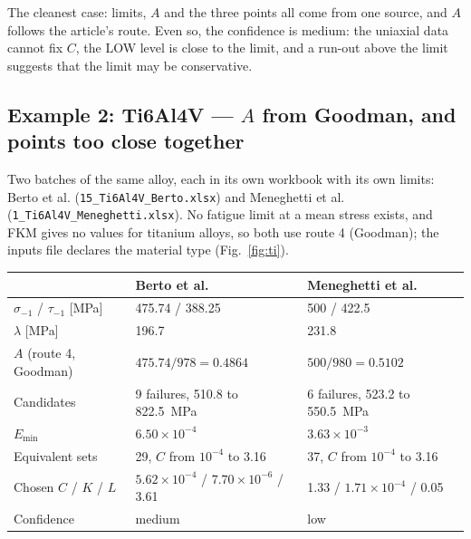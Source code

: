 \documentclass[11pt,a4paper]{article}
\newcommand{\sigm}{\sigma_{-1}}
\newcommand{\taum}{\tau_{-1}}
\newcommand{\Emin}{E_{\min}}
\begin{document}
\begin{lesson}
The cleanest case: limits, $A$ and the three points all come from one source, and $A$ follows the article's route.
Even so, the confidence is medium: the uniaxial data cannot fix $C$, the LOW level is close to the limit, and a
run-out above the limit suggests that the limit may be conservative.
\end{lesson}

\FloatBarrier
\subsection*{Example 2: Ti6Al4V --- $A$ from Goodman, and points too close together}
Two batches of the same alloy, each in its own workbook with its own limits: Berto et al.
(\texttt{15\_Ti6Al4V\_Berto.xlsx}) and Meneghetti et al. (\texttt{1\_Ti6Al4V\_Meneghetti.xlsx}). No fatigue limit
at a mean stress exists, and FKM gives no values for titanium alloys, so both use route 4 (Goodman); the inputs file
declares the material type (Fig.~\ref{fig:ti}).

\begin{center}
\begin{tabular}{@{}l l l@{}}
\toprule
 & Berto et al. & Meneghetti et al. \\
\midrule
$\sigm$ / $\taum$ [MPa] & 475.74 / 388.25 & 500 / 422.5 \\
$\lambda$ [MPa] & 196.7 & 231.8 \\
$A$ (route 4, Goodman) & $475.74/978=0.4864$ & $500/980=0.5102$ \\
Candidates & 9 failures, 510.8 to 822.5~MPa & 6 failures, 523.2 to 550.5~MPa \\
$\Emin$ & $6.50\times10^{-4}$ & $3.63\times10^{-3}$ \\
Equivalent sets & 29, $C$ from $10^{-4}$ to 3.16 & 37, $C$ from $10^{-4}$ to 3.16 \\
Chosen $C$ / $K$ / $L$ & $5.62\times10^{-4}$ / $7.70\times10^{-6}$ / 3.61 & 1.33 / $1.71\times10^{-4}$ / 0.05 \\
Confidence & medium & low \\
\bottomrule
\end{tabular}
\end{center}
\end{document}
